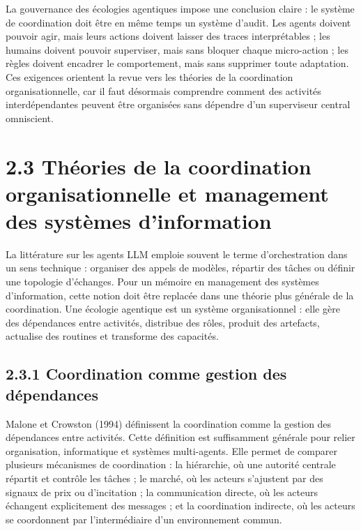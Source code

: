 La gouvernance des écologies agentiques impose une conclusion claire : le système de coordination doit être en même temps un système d'audit. Les agents doivent pouvoir agir, mais leurs actions doivent laisser des traces interprétables ; les humains doivent pouvoir superviser, mais sans bloquer chaque micro-action ; les règles doivent encadrer le comportement, mais sans supprimer toute adaptation. Ces exigences orientent la revue vers les théories de la coordination organisationnelle, car il faut désormais comprendre comment des activités interdépendantes peuvent être organisées sans dépendre d'un superviseur central omniscient.

\section{2.3 Théories de la coordination organisationnelle et management des systèmes d'information}\label{thuxe9ories-de-la-coordination-organisationnelle-et-management-des-systuxe8mes-dinformation}

La littérature sur les agents LLM emploie souvent le terme d'orchestration dans un sens technique : organiser des appels de modèles, répartir des tâches ou définir une topologie d'échanges. Pour un mémoire en management des systèmes d'information, cette notion doit être replacée dans une théorie plus générale de la coordination. Une écologie agentique est un système organisationnel : elle gère des dépendances entre activités, distribue des rôles, produit des artefacts, actualise des routines et transforme des capacités.

\subsection{2.3.1 Coordination comme gestion des dépendances}\label{coordination-comme-gestion-des-duxe9pendances}

Malone et Crowston (1994) définissent la coordination comme la gestion des dépendances entre activités. Cette définition est suffisamment générale pour relier organisation, informatique et systèmes multi-agents. Elle permet de comparer plusieurs mécanismes de coordination : la hiérarchie, où une autorité centrale répartit et contrôle les tâches ; le marché, où les acteurs s'ajustent par des signaux de prix ou d'incitation ; la communication directe, où les acteurs échangent explicitement des messages ; et la coordination indirecte, où les acteurs se coordonnent par l'intermédiaire d'un environnement commun.

